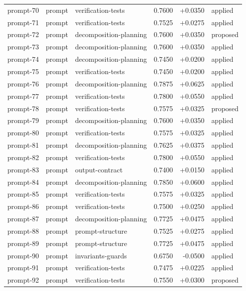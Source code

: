 \begin{center}
\begin{longtable}{llp{5.2cm}rrl}
prompt-70 & prompt & verification-tests & 0.7600 & +0.0350 & applied \\
prompt-71 & prompt & verification-tests & 0.7525 & +0.0275 & applied \\
prompt-72 & prompt & decomposition-planning & 0.7600 & +0.0350 & proposed \\
prompt-73 & prompt & decomposition-planning & 0.7600 & +0.0350 & applied \\
prompt-74 & prompt & decomposition-planning & 0.7450 & +0.0200 & applied \\
prompt-75 & prompt & verification-tests & 0.7450 & +0.0200 & applied \\
prompt-76 & prompt & decomposition-planning & 0.7875 & +0.0625 & applied \\
prompt-77 & prompt & verification-tests & 0.7800 & +0.0550 & applied \\
prompt-78 & prompt & verification-tests & 0.7575 & +0.0325 & proposed \\
prompt-79 & prompt & decomposition-planning & 0.7600 & +0.0350 & applied \\
prompt-80 & prompt & verification-tests & 0.7575 & +0.0325 & applied \\
prompt-81 & prompt & decomposition-planning & 0.7625 & +0.0375 & applied \\
prompt-82 & prompt & verification-tests & 0.7800 & +0.0550 & applied \\
prompt-83 & prompt & output-contract & 0.7400 & +0.0150 & applied \\
prompt-84 & prompt & decomposition-planning & 0.7850 & +0.0600 & applied \\
prompt-85 & prompt & verification-tests & 0.7575 & +0.0325 & applied \\
prompt-86 & prompt & verification-tests & 0.7500 & +0.0250 & applied \\
prompt-87 & prompt & decomposition-planning & 0.7725 & +0.0475 & applied \\
prompt-88 & prompt & prompt-structure & 0.7525 & +0.0275 & applied \\
prompt-89 & prompt & prompt-structure & 0.7725 & +0.0475 & applied \\
prompt-90 & prompt & invariants-guards & 0.6750 & -0.0500 & applied \\
prompt-91 & prompt & verification-tests & 0.7475 & +0.0225 & applied \\
prompt-92 & prompt & verification-tests & 0.7550 & +0.0300 & proposed \\

\end{longtable}
\end{center}
